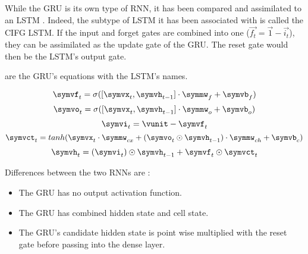 While the \ac{GRU} is its own type of \ac{RNN}, it has been compared and assimilated to an \ac{LSTM} \cite{nbLSTM}. Indeed, the subtype of \ac{LSTM} it has been associated with is called the \ac{CIFG} \ac{LSTM}. If the input and forget gates are combined into one ($\overrightarrow{f_t}=\overrightarrow{1}-\overrightarrow{i_t}$), they can be assimilated as the update gate of the \ac{GRU}. The reset gate would then be the \ac{LSTM}'s output gate.

 are the \ac{GRU}'s equations with the \ac{LSTM}'s names.

\begin{equation}\label{eq:lstmGru0}
  \symvf_t=\sigma ([\symvx_t,\symvh_{t-1}] \cdot \symmw_f + \symvb_f)
\end{equation}
\begin{equation}\label{eq:lstmGru1}
  \symvo_t=\sigma ([\symvx_t,\symvh_{t-1}] \cdot \symmw_o + \symvb_o)
\end{equation}
\begin{equation}\label{eq:lstmGru2}
  \symvi_t=\vunit-\symvf_t
\end{equation}
\begin{equation}\label{eq:lstmGru3}
  \symvct_t=tanh(\symvx_t\cdot \symmw_{cx}+(\symvo_t\odot\symvh_{t-1}) \cdot \symmw_{ch} + \symvb_c)
\end{equation}
\begin{equation}\label{eq:lstmGru4}
  \symvh_t=(\symvi_t)\odot \symvh_{t-1} + \symvf_t\odot \symvct_t
\end{equation}

Differences between the two \acp{RNN} are :
\begin{itemize}
  \item The \ac{GRU} has no output activation function.
  \item The \ac{GRU} has combined hidden state and cell state.
  \item The \ac{GRU}'s candidate hidden state is point wise multiplied with the reset gate before passing into the dense layer.
\end{itemize}
